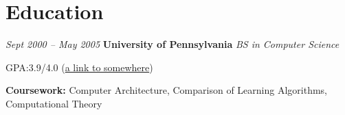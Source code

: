 \section{Education}
\begin{twocolentry}{
    \textit{Sept 2000 – May 2005}}
    \textbf{University of Pennsylvania}
    \textit{BS in Computer Science}
\end{twocolentry}

\vspace{0.10 cm}
\begin{onecolentry}
    \begin{highlights}
        \item GPA:\@ 3.9/4.0 (\href{https://example.com}{a link to somewhere})
        \item \textbf{Coursework:} Computer Architecture, Comparison of Learning Algorithms, Computational Theory
    \end{highlights}
\end{onecolentry}